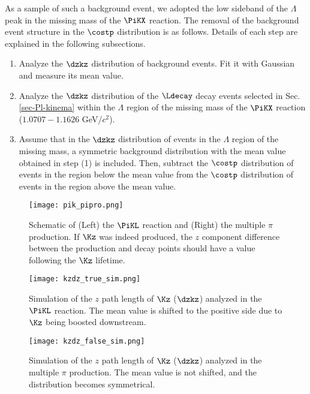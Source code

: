 As a sample of such a background event, we adopted the low sideband of the $\Lambda$ peak in the missing mass of the $\PiKX$ reaction. The removal of the background event structure in the $\costp$ distribution is as follows. Details of each step are explained in the following subsections. 

\begin{enumerate}
  \item Analyze the $\dzkz$ distribution of background events. Fit it with Gaussian and measure its mean value.
  \item Analyze the $\dzkz$ distribution of the $\Ldecay$ decay events selected in Sec. \ref{sec-Pl-kinema} within the $\Lambda$ region of the missing mass of the $\PiKX$ reaction ($1.0707-1.1626$ GeV/$c^{2}$).
  \item Assume that in the $\dzkz$ distribution of events in the $\Lambda$ region of the missing mass, a symmetric background distribution with the mean value obtained in step (1) is included. Then, subtract the $\costp$ distribution of events in the region below the mean value from the $\costp$ distribution of events in the region above the mean value.
\end{enumerate}

\begin{figure}[h]
  \centering
  \texttt{[image: pik\_pipro.png]}
  \caption{Schematic of (Left) the $\PiKL$ reaction and (Right) the multiple $\pi$ production. If $\Kz$ was indeed produced, the $z$ component difference between the production and decay points should have a value following the $\Kz$ lifetime.}
  \label{fig-pik_pipro}
\end{figure}
 
\begin{figure}[!h]
  \begin{minipage}[t]{0.48\columnwidth}
    \centering
    \texttt{[image: kzdz\_true\_sim.png]}
    \caption{Simulation of the $z$ path length of $\Kz$ ($\dzkz$) analyzed in the $\PiKL$ reaction. The mean value is shifted to the positive side due to $\Kz$ being boosted downstream.}
    \label{fig-kzdz_true_sim}
  \end{minipage}
  \hspace{0.04\columnwidth} %
  \begin{minipage}[t]{0.48\columnwidth}
    \centering
    \texttt{[image: kzdz\_false\_sim.png]}
    \caption{Simulation of the $z$ path length of $\Kz$ ($\dzkz$) analyzed in the multiple $\pi$ production. The mean value is not shifted, and the distribution becomes symmetrical.}
    \label{fig-kzdz_false_sim}
  \end{minipage}
\end{figure}



